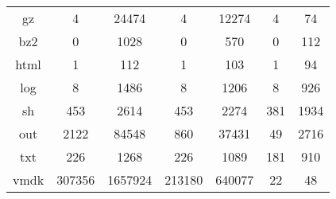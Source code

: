 \begin{table}[!htbp]
\begin{tabular}{@{}ccccccc@{}}
gz   & 4      & 24474   & 4       & 12274  & 4               & 74   \\
bz2  & 0      & 1028    & 0       & 570    & 0               & 112  \\ 
html & 1      & 112     & 1       & 103    & 1               & 94   \\
log  & 8      & 1486    & 8       & 1206   & 8               & 926  \\
sh   & 453    & 2614    & 453     & 2274   & 381             & 1934 \\
out  & 2122   & 84548   & 860     & 37431  & 49              & 2716 \\
txt  & 226    & 1268    & 226     & 1089   & 181             & 910  \\
vmdk & 307356 & 1657924 & 213180  & 640077 & 22              & 48   \\
\bottomrule
\end{tabular}
\end{table}
